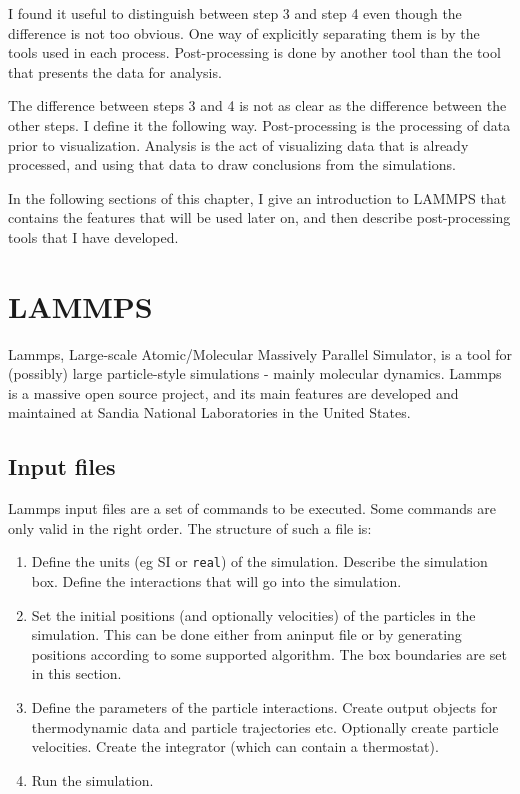 I found it useful to distinguish between step 3 and step 4 even though the difference is not too obvious. One way of explicitly separating them is by the tools used in each process. Post-processing is done by another tool than the tool that presents the data for analysis. 

The difference between steps 3 and 4 is not as clear as the difference between the other steps. I define it the following way. Post-processing is the processing of data prior to visualization. Analysis is the act of visualizing data that is already processed, and using that data to draw conclusions from the simulations. 

In the following sections of this chapter, I give an introduction to LAMMPS that contains the features that will be used later on, and then describe post-processing tools that I have developed. 

\section{LAMMPS}
Lammps, Large-scale Atomic/Molecular Massively Parallel Simulator, is a tool for (possibly) large particle-style simulations - mainly molecular dynamics. Lammps is a massive open source project, and its main features are developed and maintained at Sandia National Laboratories in the United States. 

\subsection{Input files}
Lammps input files are a set of commands to be executed. Some commands are only valid in the right order. The structure of such a file is:

\begin{enumerate}
\item {} Define the units (eg SI or {\tt real}) of the simulation. Describe the simulation box. Define the interactions that will go into the simulation. 
\item {} Set the initial positions (and optionally velocities) of the particles in the simulation. This can be done either from aninput file or by generating positions according to some supported algorithm. The box boundaries are set in this section.
\item {} Define the parameters of the particle interactions. Create output objects for thermodynamic data and particle trajectories etc. Optionally create particle velocities. Create the integrator (which can contain a thermostat).
\item {} Run the simulation.
\end{enumerate}
